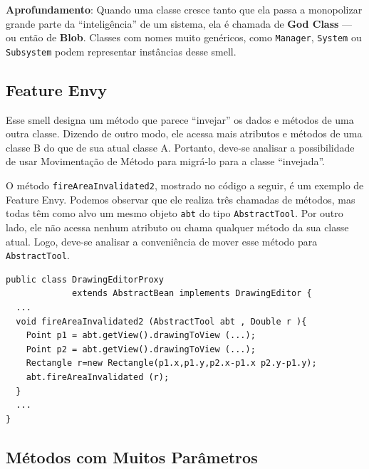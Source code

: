 \documentclass[
  11pt,
  twoside]{book}
\newcommand{\passthrough}[1]{#1}
\newenvironment{esmbox}{\centering \vspace{1.5ex} \begin{tcolorbox}[breakable, colback=backcolor, width=4.9in]}{\end{tcolorbox} \vspace{1.5ex}}
\begin{document}
  

\begin{esmbox}

\textbf{Aprofundamento}: Quando uma classe cresce tanto que ela passa a
monopolizar grande parte da ``inteligência'' de um sistema, ela é
chamada de \textbf{God Class} --- ou então de \textbf{Blob}. Classes com
nomes muito genéricos, como \passthrough{\lstinline!Manager!},
\passthrough{\lstinline!System!} ou \passthrough{\lstinline!Subsystem!}
podem representar instâncias desse smell.

\end{esmbox}

\hypertarget{feature-envy}{%
\subsection{Feature Envy}\label{feature-envy}}

 

Esse smell designa um método que parece ``invejar'' os dados e métodos
de uma outra classe. Dizendo de outro modo, ele acessa mais atributos e
métodos de uma classe B do que de sua atual classe A. Portanto, deve-se
analisar a possibilidade de usar Movimentação de Método para migrá-lo
para a classe ``invejada''.

O método \passthrough{\lstinline!fireAreaInvalidated2!}, mostrado no
código a seguir, é um exemplo de Feature Envy. Podemos observar que ele
realiza três chamadas de métodos, mas todas têm como alvo um mesmo
objeto \passthrough{\lstinline!abt!} do tipo
\passthrough{\lstinline!AbstractTool!}. Por outro lado, ele não acessa
nenhum atributo ou chama qualquer método da sua classe atual. Logo,
deve-se analisar a conveniência de mover esse método para
\passthrough{\lstinline!AbstractTool!}.

\begin{lstlisting}
public class DrawingEditorProxy 
             extends AbstractBean implements DrawingEditor {
  ...
  void fireAreaInvalidated2 (AbstractTool abt , Double r ){
    Point p1 = abt.getView().drawingToView (...);
    Point p2 = abt.getView().drawingToView (...);
    Rectangle r=new Rectangle(p1.x,p1.y,p2.x-p1.x p2.y-p1.y);
    abt.fireAreaInvalidated (r);
  }
  ...
}
\end{lstlisting}

\hypertarget{muxe9todos-com-muitos-paruxe2metros}{%
\subsection{Métodos com Muitos
Parâmetros}\label{muxe9todos-com-muitos-paruxe2metros}}
\end{document}
